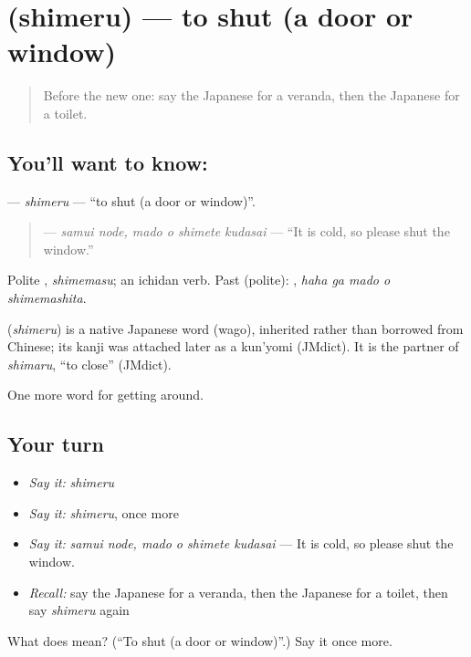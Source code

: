 \section[\texorpdfstring{\ja{しめる} (shimeru)}{しめる (shimeru)}]{ (shimeru) — to shut (a door or window)}

\label{lesson:JA-C400-shimeru}



\begin{quote}
Before the new one: say the Japanese for a veranda, then the Japanese for a toilet.
\end{quote}

\subsection*{You'll want to know: }
\textbf{} — \emph{shimeru} — \textquotedblleft{}to shut (a door or window)\textquotedblright{}.

\begin{quote}
\textbf{  } — \emph{samui node, mado o shimete kudasai} — \textquotedblleft{}It is cold, so please shut the window.\textquotedblright{}
\end{quote}

Polite \textbf{}, \emph{shimemasu}; an ichidan verb. Past (polite): \textbf{  }, \emph{haha ga mado o shimemashita}.

\begin{cousinweb}
\textbf{} (\emph{shimeru}) is a native Japanese word (wago), inherited rather than borrowed from Chinese; its kanji was attached later as a kun'yomi (JMdict). It is the partner of \emph{shimaru}, \textquotedblleft{}to close\textquotedblright{} (JMdict).
\end{cousinweb}

\begin{grammarlens}[title={What you've built}]
One more word for getting around.
\end{grammarlens}

\subsection*{Your turn}
\begin{itemize}
\raggedright
  \item \emph{Say it:} \emph{shimeru}
  \item \emph{Say it:} \emph{shimeru}, once more
  \item \emph{Say it:} \emph{samui node, mado o shimete kudasai} — It is cold, so please shut the window.
  \item \emph{Recall:} say the Japanese for a veranda, then the Japanese for a toilet, then say \emph{shimeru} again
\end{itemize}

\begin{tcolorbox}[breakable,colback=teal!4,colframe=teal!35!black,title={Before you move on}]
What does  mean? (\textquotedblleft{}To shut (a door or window)\textquotedblright{}.) Say it once more.
\end{tcolorbox}
